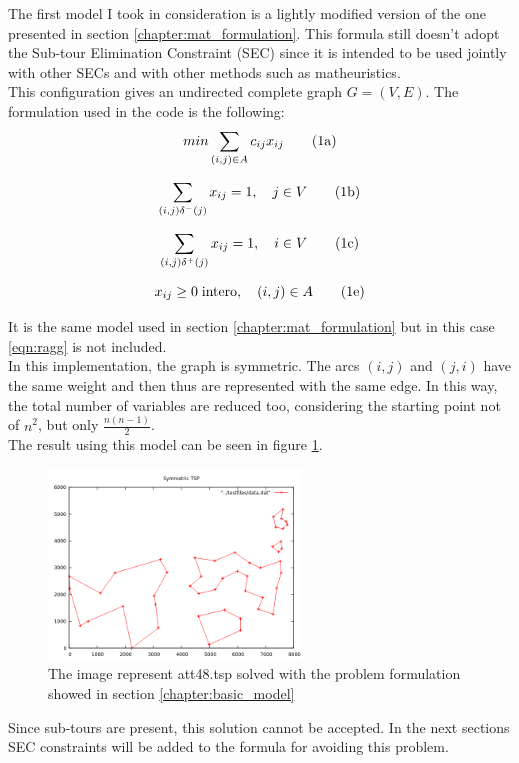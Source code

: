 The first model I took in consideration is a lightly modified version of the one presented in section \ref{chapter:mat_formulation}. This formula still doesn't adopt the Sub-tour Elimination Constraint (SEC) since it is intended to be used jointly with other SECs and with other methods such as matheuristics.\\
This configuration gives an undirected complete graph $G=(V,E)$. The formulation used in the code is the following:
	\begin{equation}
	\label{eqn:cost-2}
	min\sum_{(i,j)\in A}c_{ij}x_{ij}
	\stepcounter{equation}\tag{{\theequation}a}
	\end{equation}
	
	\begin{equation}
	\label{eqn:in-2}
	\sum_{(i,j)\delta^-(j)}x_{ij}=1, \quad j\in V
	\tag{{\theequation}b}
	\end{equation}
	
	\begin{equation}
	\label{eqn:out-2}
	\sum_{(i,j)\delta^+(j)}x_{ij}=1, \quad i\in V
	\tag{{\theequation}c}
	\end{equation}
	
	\begin{equation}
	x_{ij}\ge 0 \; \text{intero} , \quad (i, j) \in A
	\tag{{\theequation}e}
	\end{equation}


It is the same model used in section \ref{chapter:mat_formulation} but in this case \ref{eqn:ragg} is not included.\\
In this implementation, the graph is symmetric. The arcs $(i, j)$ and $(j, i)$ have the same weight and then thus are represented with the same edge. In this way, the total number of variables are reduced too, considering the starting point not of $n^2$, but only $\frac{n(n-1)}{2}$.\\
The result using this model can be seen in figure \ref{fig:basic_model}.

\begin{figure}[h]
	\centering
	\includegraphics[width=0.6\textwidth]{images/symmetric_with_tours.png}
	\caption{The image represent att48.tsp solved with the problem formulation showed in section \ref{chapter:basic_model}}
	\label{fig:basic_model}
\end{figure}

Since sub-tours are present, this solution cannot be accepted. In the next sections SEC constraints will be added to the formula for avoiding this problem.